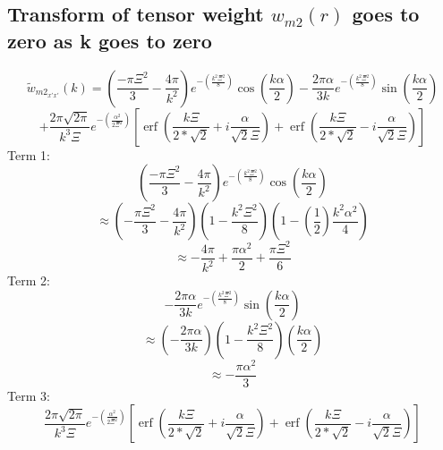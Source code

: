 \documentclass[letterpaper,twocolumn,amsmath,amssymb,prb]{revtex4-1}
\begin{document}
\begin{widetext}
\subsection{Transform of tensor weight ${w}_{m2}(r)$ goes to zero as k goes to zero}
\begin{displaymath}{\widetilde{w}_{{m2}_{x'x'}}(k)=\left(\frac{-\pi\Xi^2}{3}-\frac{4\pi}{k^2}\right)e^{-\left(\frac{k^2\Xi^2}{8}\right)}\cos(\frac{k\alpha}{2})-\frac{2\pi\alpha}{3k}e^{-\left(\frac{k^2\Xi^2}{8}\right)}\sin(\frac{k\alpha}{2})}\end{displaymath} 
\begin{equation}{+\frac{2\pi\sqrt{2\pi}}{k^3\Xi}e^{-\left(\frac{\alpha^2}{2\Xi^2}\right)}\left[\operatorname{erf}\left(\frac{k\Xi}{2*\sqrt{2}}+i\frac{\alpha}{\sqrt{2}\Xi}\right)+\operatorname{erf}\left(\frac{k\Xi}{2*\sqrt{2}}-i\frac{\alpha}{\sqrt{2}\Xi}\right)\right]}\end{equation}
Term 1: 
\color{green}
\begin{equation}{\left(\frac{-\pi\Xi^2}{3}-\frac{4\pi}{k^2}\right)e^{-\left(\frac{k^2\Xi^2}{8}\right)}\cos(\frac{k\alpha}{2})}\end{equation}
\begin{displaymath}{\approx\left(-\frac{\pi\Xi^2}{3}-\frac{4\pi}{k^2}\right)\left(1-\frac{k^2\Xi^2}{8}\right)\left(1-\left(\frac{1}{2}\right)\frac{k^2\alpha^2}{4}\right)}\end{displaymath} 
\begin{displaymath}{\approx-\frac{4\pi}{k^2}+\frac{\pi\alpha^2}{2}+\frac{\pi\Xi^2}{6}}\end{displaymath} 
\color{black}
Term 2:
\color{blue}
\begin{equation}{-\frac{2\pi\alpha}{3k}e^{-\left(\frac{k^2\Xi^2}{8}\right)}\sin(\frac{k\alpha}{2})}\end{equation} 
\begin{displaymath}{\approx\left(-\frac{2\pi\alpha}{3k}\right)\left(1-\frac{k^2\Xi^2}{8}\right)\left(\frac{k\alpha}{2}\right)}\end{displaymath} 
\begin{displaymath}{\approx}-\frac{\pi\alpha^2}{3}\end{displaymath}
\color{black} 
Term 3:
\color{red}
\begin{equation}{\frac{2\pi\sqrt{2\pi}}{k^3\Xi}e^{-\left(\frac{\alpha^2}{2\Xi^2}\right)}\left[\operatorname{erf}\left(\frac{k\Xi}{2*\sqrt{2}}+i\frac{\alpha}{\sqrt{2}\Xi}\right)+\operatorname{erf}\left(\frac{k\Xi}{2*\sqrt{2}}-i\frac{\alpha}{\sqrt{2}\Xi}\right)\right]}\end{equation}

\end{widetext}
\end{document}
